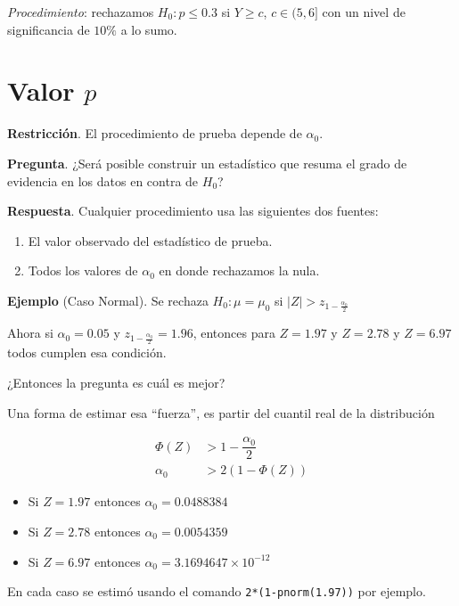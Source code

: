 \documentclass[
  12pt,
]{book}
\providecommand{\tightlist}{%
  \setlength{\itemsep}{0pt}\setlength{\parskip}{0pt}}
\begin{document}
\emph{Procedimiento}: rechazamos \(H_0: p \leq 0.3\) si \(Y\geq c\), \(c\in(5,6]\) con un
nivel de significancia de \(10\%\) a lo sumo.

\hypertarget{valor-p}{%
\section{\texorpdfstring{Valor \(p\)}{Valor p}}\label{valor-p}}

\textbf{Restricción}. El procedimiento de prueba depende de \(\alpha_0\).

\textbf{Pregunta}. ¿Será posible construir un estadístico que resuma el grado de
evidencia en los datos en contra de \(H_0\)?

\textbf{Respuesta}. Cualquier procedimiento usa las siguientes dos fuentes:

\begin{enumerate}
\def\labelenumi{\arabic{enumi}.}
\item
  El valor observado del estadístico de prueba.
\item
  Todos los valores de \(\alpha_0\) en donde rechazamos la nula.
\end{enumerate}

\textbf{Ejemplo} (Caso Normal). Se rechaza \(H_0: \mu = \mu_0\) si \(|Z|>z_{1-\frac{\alpha_0}2}\)

Ahora si \(\alpha_0 = 0.05\) y \(z_{1-\frac{\alpha_0}2} = 1.96\), entonces para
\(Z = 1.97\) y \(Z = 2.78\) y \(Z = 6.97\) todos cumplen esa condición.

¿Entonces la pregunta es cuál es mejor?

Una forma de estimar esa ``fuerza'', es partir del cuantil real de la distribución

\begin{align*}
\Phi(Z) &> 1-\dfrac{\alpha_0}2 \\
\alpha_0 &> 2(1-\Phi(Z)) 
\end{align*}

\begin{itemize}
\tightlist
\item
  Si \(Z=1.97\) entonces \(\alpha _{0} =0.0488384\)
\item
  Si \(Z=2.78\) entonces \(\alpha _{0} =0.0054359\)
\item
  Si \(Z=6.97\) entonces \(\alpha _{0} =\ensuremath{3.1694647\times 10^{-12}}\)
\end{itemize}

En cada caso se estimó usando el comando \texttt{2*(1-pnorm(1.97))} por ejemplo.
\end{document}
